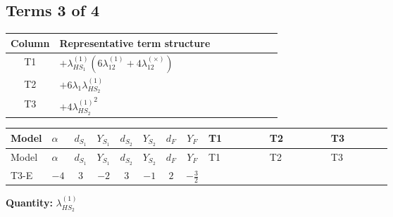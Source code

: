 \documentclass[8pt]{article}
\begin{document}
\begin{landscape}
\subsection*{Terms 3 of 4}
\begin{center}
\begin{tabular}{@{}c >{\raggedright\arraybackslash}p{0.82\linewidth}@{}}
\toprule
Column & Representative term structure \\
\midrule
T1 & \(\displaystyle +{\lambda_{HS_1}^{(1)}} (6 {\lambda_{12}^{(1)}}+4 {\lambda_{12}^{(\times)}})\) \\
\midrule
T2 & \(\displaystyle +6 {\lambda_1} {\lambda_{HS_2}^{(1)}}\) \\
\midrule
T3 & \(\displaystyle +4 {\lambda_{HS_2}^{(1)}}^2\) \\
\midrule
\bottomrule
\end{tabular}
\end{center}
\smallskip
\tiny
\begin{longtable}{@{}llcccccc >{\raggedright\arraybackslash}p{0.21\linewidth} >{\raggedright\arraybackslash}p{0.21\linewidth} >{\raggedright\arraybackslash}p{0.21\linewidth}@{}}
\toprule
Model & $\alpha$ & $d_{S_1}$ & $Y_{S_1}$ & $d_{S_2}$ & $Y_{S_2}$ & $d_F$ & $Y_F$ & T1 & T2 & T3 \\
\midrule
\endfirsthead
\toprule
Model & $\alpha$ & $d_{S_1}$ & $Y_{S_1}$ & $d_{S_2}$ & $Y_{S_2}$ & $d_F$ & $Y_F$ & T1 & T2 & T3 \\
\midrule
\endhead
T3-E & $-4$ & $3$ & $-2$ & $3$ & $-1$ & $2$ & $-\frac{3}{2}$ & \scriptsize\adjustbox{max width=\linewidth}{$\begin{gathered} +{\lambda_{HS_1}^{(1)}} (6 {\lambda_{12}^{(1)}}+4 {\lambda_{12}^{(\times)}})\end{gathered}$} & \scriptsize\adjustbox{max width=\linewidth}{$\begin{gathered} +6 {\lambda_1} {\lambda_{HS_2}^{(1)}}\end{gathered}$} & \scriptsize\adjustbox{max width=\linewidth}{$\begin{gathered} +4 {\lambda_{HS_2}^{(1)}}^2\end{gathered}$} \\
\midrule
\bottomrule
\end{longtable}
\clearpage
\noindent\textbf{Quantity: }$\lambda_{HS_2}^{(1)}$\par\smallskip

\end{landscape}
\end{document}
